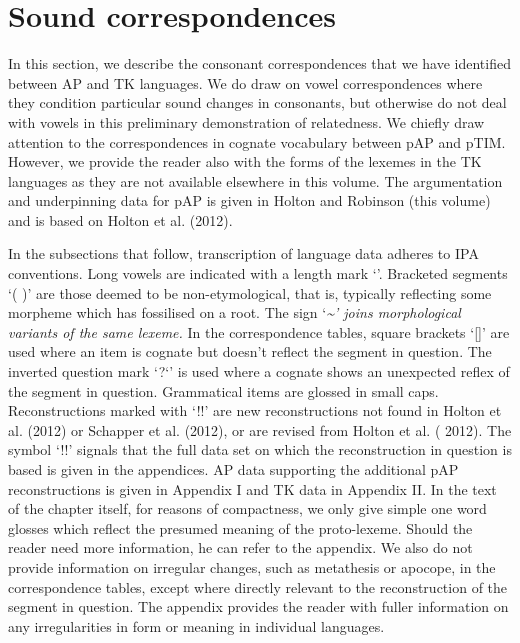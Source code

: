 \section[Sound correspondences]{Sound correspondences}
\hypertarget{RefHeading65405871885726}{}In this section, we describe the consonant correspondences that we have identified between AP and TK languages. We do draw on vowel correspondences where they condition particular sound changes in consonants, but otherwise do not deal with vowels in this preliminary demonstration of relatedness. We chiefly draw attention to the correspondences in cognate vocabulary between pAP and pTIM. However, we provide the reader also with the forms of the lexemes in the TK languages as they are not available elsewhere in this volume. The argumentation and underpinning data for pAP is given in Holton and Robinson (this volume) and is based on Holton et al. (2012).

In the subsections that follow, transcription of language data adheres to IPA conventions. Long vowels are indicated with a length mark {\textquoteleft}{\textlengthmark}{\textquoteright}. Bracketed segments {\textquoteleft}( ){\textquoteright} are those deemed to be non-etymological, that is, typically reflecting some morpheme which has fossilised on a root. The sign {\textquoteleft}\emph{\textup{\~{}{\textquoteright} joins morphological variants of the same lexeme. }}In the correspondence tables, square brackets {\textquoteleft}[]{\textquoteright} are used where an item is cognate but doesn{\textquoteright}t reflect the segment in question. The inverted question mark {\textquoteleft}?`{\textquoteright} is used where a cognate shows an unexpected reflex of the segment in question. Grammatical items are glossed in small caps. Reconstructions marked with {\textquoteleft}!!{\textquoteright} are new reconstructions not found in Holton et al. (2012) or Schapper et al. (2012), or are revised from Holton et al. (
2012). The symbol {\textquoteleft}!!{\textquoteright} signals that the full data set on which the reconstruction in question is based is given in the appendices. AP data supporting the additional pAP reconstructions is given in Appendix I and TK data in Appendix II. In the text of the chapter itself, for reasons of compactness, we only give simple one word glosses which reflect the presumed meaning of the proto-lexeme. Should the reader need more information, he can refer to the appendix. We also do not provide information on irregular changes, such as metathesis or apocope, in the correspondence tables, except where directly relevant to the reconstruction of the segment in question. The appendix provides the reader with fuller information on any irregularities in form or meaning in individual languages. 


